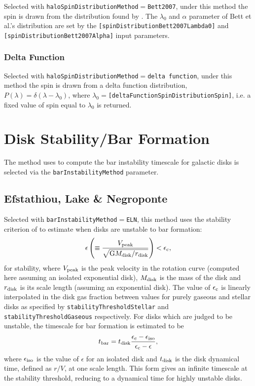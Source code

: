 Selected with {\tt haloSpinDistributionMethod}$=${\tt Bett2007}, under this method the spin is drawn from the distribution found by \cite{bett_spin_2007}. The $\lambda_0$ and $\alpha$ parameter of Bett et al.'s distribution are set by the {\tt [spinDistributionBett2007Lambda0]} and {\tt [spinDistributionBett2007Alpha]} input parameters.

\subsubsection{Delta Function}

Selected with {\tt haloSpinDistributionMethod}$=${\tt delta function}, under this method the spin is drawn from a delta function distribution, $P(\lambda) = \delta(\lambda-\lambda_0)$, where $\lambda_0=${\tt [deltaFunctionSpinDistributionSpin]}, i.e. a fixed value of spin equal to $\lambda_0$ is returned.

\section{Disk Stability/Bar Formation}\label{sec:DiskStability}

The method uses to compute the bar instability timescale for galactic disks is selected via the {\tt barInstabilityMethod} parameter.

\subsection{Efstathiou, Lake \& Negroponte}

Selected with {\tt barInstabilityMethod}$=${\tt ELN}, this method uses the stability criterion of \cite{efstathiou_stability_1982} to estimate when disks are unstable to bar formation:
\begin{equation}
 \epsilon \left( \equiv {V_{\rm peak} \over \sqrt{\G M_{\rm disk}/r_{\rm disk}}} \right) < \epsilon_{\rm c},
\end{equation}
for stability, where $V_{\rm peak}$ is the peak velocity in the rotation curve (computed here assuming an isolated exponential disk), $M_{\rm disk}$ is the mass of the disk and $r_{\rm disk}$ is its scale length (assuming an exponential disk). The value of $\epsilon_{\rm c}$ is linearly interpolated in the disk gas fraction between values for purely gaseous and stellar disks as specified by {\tt stabilityThresholdStellar} and {\tt stabilityThresholdGaseous} respectively. For disks which are judged to be unstable, the timescale for bar formation is estimated to be
\begin{equation}
 t_{\rm bar} = t_{\rm disk} {\epsilon_{\rm c} - \epsilon_{\rm iso} \over \epsilon_{\rm c} - \epsilon},
\end{equation}
where $\epsilon_{\rm iso}$ is the value of $\epsilon$ for an isolated disk and $t_{\rm disk}$ is the disk dynamical time, defined as $r/V$, at one scale length. This form gives an infinite timescale at the stability threshold, reducing to a dynamical time for highly unstable disks.


